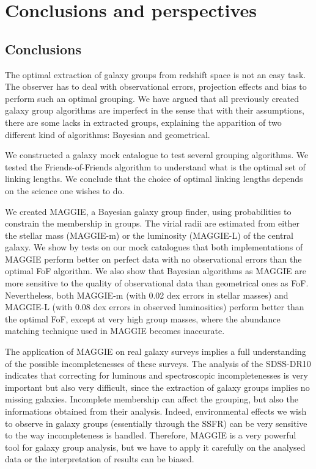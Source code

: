\chapter{Conclusions and perspectives}
\label{cha:conclusions_and_perspectives}

\section{Conclusions}
\label{sec:conclusions}

The optimal extraction of galaxy groups from redshift space is not an easy
task. The observer has to deal with observational errors, projection
effects and bias to perform such an optimal grouping. We have argued that all
previously created galaxy group algorithms are imperfect in the sense that with
their assumptions, there are some lacks in extracted groups, explaining the
apparition of two different kind of algorithms: Bayesian and geometrical.

We constructed a galaxy mock catalogue to test several grouping algorithms. We
tested the Friends-of-Friends algorithm to understand what is the optimal set
of linking lengths. We conclude that the choice of optimal linking lengths
depends on the science one wishes to do.

We created MAGGIE, a Bayesian galaxy group finder, using probabilities to
constrain the membership in groups. The virial radii are estimated from either
the stellar mass (MAGGIE-m) or the luminosity (MAGGIE-L) of the central galaxy.
We show by tests on our mock catalogues that both implementations of MAGGIE
perform better on perfect data with no observational errors than the optimal
FoF algorithm. We also show that Bayesian algorithms as MAGGIE are more
sensitive to the quality of observational data than geometrical ones as FoF.
Nevertheless, both MAGGIE-m (with 0.02 dex errors in stellar masses) and
MAGGIE-L (with 0.08 dex errors in observed luminosities) perform better than
the optimal FoF, except at very high group masses, where the abundance matching
technique used in MAGGIE becomes inaccurate.

The application of MAGGIE on real galaxy surveys implies a full understanding
of the possible incompletenesses of these surveys. The analysis of the
SDSS-DR10 indicates that correcting for luminous and spectroscopic
incompletenesses is very important but also very difficult, since the
extraction of galaxy groups implies no missing galaxies. Incomplete membership
can affect the grouping, but also the informations obtained from their
analysis. Indeed, environmental effects we wish to observe in galaxy groups
(essentially through the SSFR) can be very sensitive to the way incompleteness
is handled. Therefore, MAGGIE is a very powerful tool for galaxy group
analysis, but we have to apply it carefully on the analysed data or the
interpretation of results can be biased.

